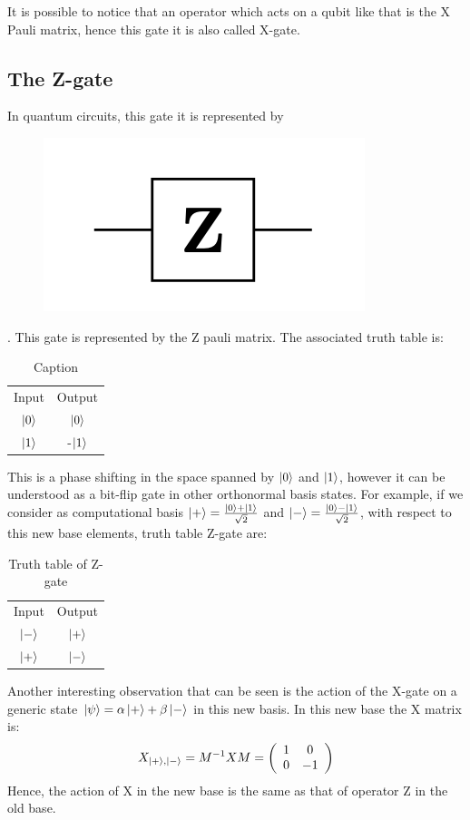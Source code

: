 It is possible to notice that an operator which acts on a qubit like that is the X Pauli matrix, hence this gate it is also called X-gate.

\subsection*{The Z-gate}
In quantum circuits, this gate it is represented by \begin{figure}[H]
\centering
\includegraphics{Mainmatter/images/ZGATE.png}
\end{figure}.
This gate is represented by the Z pauli matrix. The associated truth table is: 
\begin{table}[h!]
    \centering
    \begin{tabular}{c|c}
         Input & Output \\
          $\ket{0}$ & $\ket{0}$ \\
          $\ket{1}$ & -$\ket{1}$
    \end{tabular}
    \caption{Caption}
    \label{tab:my_label}
\end{table}


This is a phase shifting in the space spanned by $\ket{0}$ and $\ket{1}$, however it can be understood as a bit-flip gate in other orthonormal basis states. For example, if we consider as computational basis $\ket{+}= \frac{\ket{0} + \ket{1}}{\sqrt{2}}$ and $\ket{-} = \frac{\ket{0} - \ket{1}}{\sqrt{2}}$, with respect to this new base elements, truth table Z-gate are:
\begin{table}[h!]
    \centering
    \begin{tabular}{c|c}
         Input & Output \\
          $\ket{-}$ & $\ket{+}$ \\
          $\ket{+}$ & $\ket{-}$
    \end{tabular}
    \caption{Truth table of Z-gate}
    \label{tab:not_gate}
\end{table}
Another interesting observation that can be seen is the action of the X-gate on a generic state $\ket{\psi} = \alpha \ket{+} + \beta \ket{-}$ in this new basis. In this new base the X matrix is: 
\begin{equation*}
    X_{\ket{+},\ket{-}} = M^{-1}X M = \left(\begin{array}{cc}
1 & 0 \\
0 & -1
\end{array}\right)  
\end{equation*}
Hence, the action of X in the new base is the same as that of operator Z in the old base.


